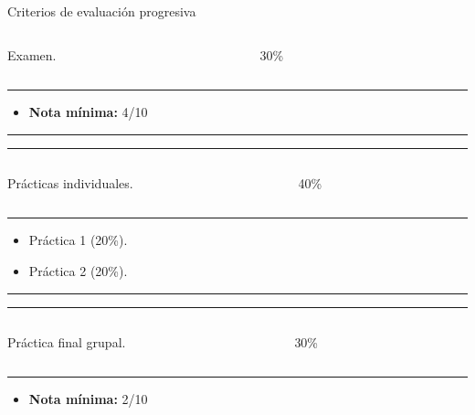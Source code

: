 \begin{frame}{Criterios de evaluación progresiva}
\begin{columns}[T]
\begin{column}{.49\textwidth}
Examen.
\end{column}
\hfill
\begin{column}{.49\textwidth}
\centering
\alert{\Huge 30\%}
\end{column}
\end{columns}
\vfill
\hrule

\begin{itemize}
    \item \textbf{Nota mínima:} 4/10
\end{itemize}
\vfill
\hrule
\hrule

\vfill
\begin{columns}[T]
\begin{column}{.49\textwidth}
\vspace{0.2cm}
Prácticas individuales.
\end{column}
\hfill
\begin{column}{.49\textwidth}
\centering
\alert{\Huge 40\%}
\end{column}
\end{columns}
\vfill
\hrule

\begin{itemize}
    \item Práctica 1 (\alert{20\%}).
    \item Práctica 2 (\alert{20\%}).
\end{itemize}
\vfill

\hrule
\hrule

\vfill
\begin{columns}[T]
\begin{column}{.49\textwidth}
\vspace{0.2cm}
Práctica final grupal.
\end{column}
\begin{column}{.49\textwidth}
\centering
\alert{\Huge 30\%}
\end{column}
\end{columns}
\vfill
\hrule

\begin{itemize}
    \item \textbf{Nota mínima:} 2/10
\end{itemize}
\end{frame}

